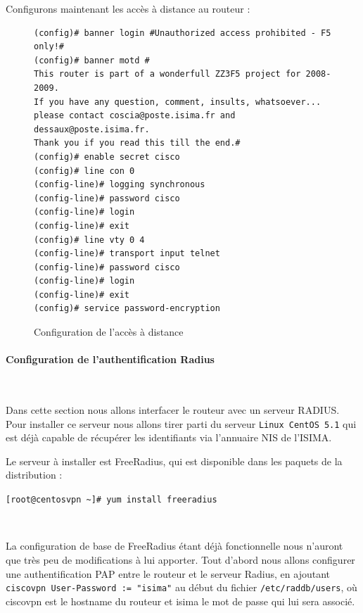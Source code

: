 Configurons maintenant les accès à distance au routeur :
\begin{figure}[H]
	\begin{center}
		\begin{minipage}{0.95\textwidth}
			\begin{lstlisting}[frame=trBL]
(config)# banner login #Unauthorized access prohibited - F5 only!#
(config)# banner motd #
This router is part of a wonderfull ZZ3F5 project for 2008-2009.
If you have any question, comment, insults, whatsoever...
please contact coscia@poste.isima.fr and dessaux@poste.isima.fr.
Thank you if you read this till the end.#
(config)# enable secret cisco
(config)# line con 0
(config-line)# logging synchronous
(config-line)# password cisco
(config-line)# login
(config-line)# exit
(config)# line vty 0 4
(config-line)# transport input telnet
(config-line)# password cisco
(config-line)# login
(config-line)# exit
(config)# service password-encryption
			\end{lstlisting}
		\end{minipage}
	\end{center}
	\caption{Configuration de l'accès à distance}
	\label{configuration_acces_a_distance}
\end{figure}

\paragraph{Configuration de l'authentification Radius}
\label{CONFIG_RADIUS}
~

Dans cette section nous allons interfacer le routeur avec un serveur RADIUS. Pour installer ce serveur nous allons tirer parti du serveur \verb|Linux CentOS 5.1| qui est déjà capable de récupérer les identifiants via l'annuaire NIS de l'ISIMA.

Le serveur à installer est FreeRadius, qui est disponible dans les paquets de la distribution :

\verb|[root@centosvpn ~]# yum install freeradius|

~

La configuration de base de FreeRadius étant déjà fonctionnelle nous n'auront que très peu de modifications à lui apporter. Tout d'abord nous allons configurer une authentification PAP entre le routeur et le serveur Radius, en ajoutant \verb|ciscovpn User-Password := "isima"|  au début du fichier \verb|/etc/raddb/users|, où ciscovpn est le hostname du routeur et isima le mot de passe qui lui sera associé.

